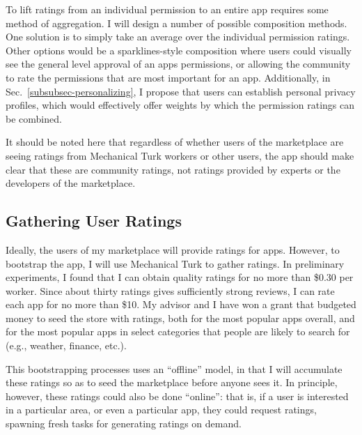 \documentclass[11pt]{article}
\begin{document}
To lift ratings from an individual permission to an entire app
requires some method of aggregation. I will design a
number of possible composition methods. One solution is to simply take
an average over the individual permission ratings. Other options would
be a sparklines-style composition where users could visually see the
general level approval of an apps permissions, or allowing the
community to rate the permissions that are most important for an app. 
Additionally, in 
Sec.~\ref{subsubsec-personalizing}, I propose that users
can establish personal privacy profiles, which would effectively offer
weights by which the permission ratings can be combined.

It should be noted here that regardless of whether users of the
marketplace are seeing ratings from Mechanical Turk workers or other
users, the app should make clear that these are community ratings, not
ratings provided by experts or the developers of the marketplace.


\subsection{Gathering User Ratings}
\label{subsec-gather-ratings}

Ideally, the users of my marketplace will provide ratings for
apps. However, 
to bootstrap the app, I will use Mechanical Turk to gather
ratings. In preliminary experiments, I found that I can obtain
quality ratings for no more than \$0.30 per worker. Since about thirty
ratings gives sufficiently strong reviews, I can rate each
app for no more than \$10. 
My advisor and I have won a grant that  budgeted money to
seed the store with ratings, both for the most popular apps overall,
and for the most popular apps in select categories that people are
likely to search for (e.g., weather, finance, etc.).

This bootstrapping processes uses an ``offline'' model, in that I 
will accumulate these ratings so as to seed the marketplace before anyone
sees it. In principle, however, these ratings could also be done
``online'': that is, if a user is interested in a particular area, or
even a particular app, they could request ratings, spawning fresh tasks for
generating ratings on demand. 
\end{document}
